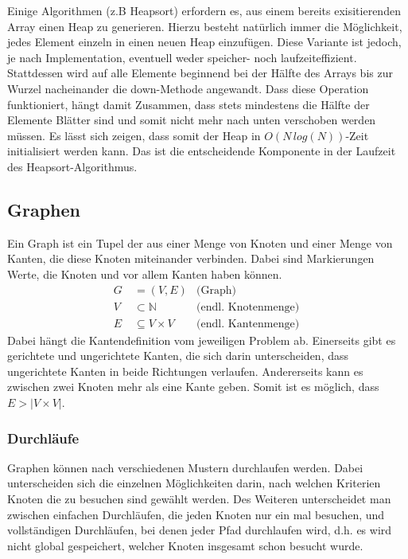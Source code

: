 \documentclass{article}
\begin{document}
Einige Algorithmen (z.B Heapsort) erfordern es, aus einem bereits exisitierenden Array einen Heap zu generieren. Hierzu besteht natürlich immer die Möglichkeit, jedes Element einzeln in einen neuen Heap einzufügen. Diese Variante ist jedoch, je nach Implementation, eventuell weder speicher- noch laufzeiteffizient. Stattdessen wird auf alle Elemente beginnend bei der Hälfte des Arrays bis zur Wurzel nacheinander die down-Methode angewandt. Dass diese Operation funktioniert, hängt damit Zusammen, dass stets mindestens die Hälfte der Elemente Blätter sind und somit nicht mehr nach unten verschoben werden müssen. Es lässt sich zeigen, dass somit der Heap in $O(N\,log(N))$-Zeit initialisiert werden kann. Das ist die entscheidende Komponente in der Laufzeit des Heapsort-Algorithmus.
\subsection{Graphen}
Ein Graph ist ein Tupel der aus einer Menge von Knoten und einer Menge von Kanten, die diese Knoten miteinander verbinden. Dabei sind Markierungen Werte, die Knoten und vor allem Kanten haben können.
\begin{align}
    G &\:= (V,E) &\text{(Graph)}\\
    V &\: \subset \mathbb{N} &\text{(endl. Knotenmenge)}\\
    E &\:\subseteq V\times V &\text{(endl. Kantenmenge)}\  
\end{align}
Dabei hängt die Kantendefinition vom jeweiligen Problem ab. Einerseits gibt es gerichtete und ungerichtete Kanten, die sich darin unterscheiden, dass ungerichtete Kanten in beide Richtungen verlaufen. Andererseits kann es zwischen zwei Knoten mehr als eine Kante geben. Somit ist es möglich, dass $E >|V\times V|$.
\subsubsection{Durchläufe}
Graphen können nach verschiedenen Mustern durchlaufen werden. Dabei unterscheiden sich die einzelnen Möglichkeiten darin, nach welchen Kriterien Knoten die zu besuchen sind gewählt werden. Des Weiteren unterscheidet man zwischen einfachen Durchläufen, die jeden Knoten nur ein mal besuchen, und vollständigen Durchläufen, bei denen jeder Pfad durchlaufen wird, d.h. es wird nicht global gespeichert, welcher Knoten insgesamt schon besucht wurde.
\end{document}
